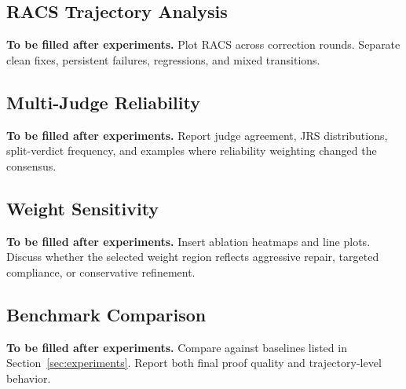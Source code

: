 \documentclass[conference]{IEEEtran}
\begin{document}
\subsection{RACS Trajectory Analysis}
\noindent\textbf{To be filled after experiments.} Plot RACS across correction rounds. Separate clean fixes, persistent failures, regressions, and mixed transitions.

\subsection{Multi-Judge Reliability}
\noindent\textbf{To be filled after experiments.} Report judge agreement, JRS distributions, split-verdict frequency, and examples where reliability weighting changed the consensus.

\subsection{Weight Sensitivity}
\noindent\textbf{To be filled after experiments.} Insert ablation heatmaps and line plots. Discuss whether the selected weight region reflects aggressive repair, targeted compliance, or conservative refinement.

\subsection{Benchmark Comparison}
\noindent\textbf{To be filled after experiments.} Compare against baselines listed in Section~\ref{sec:experiments}. Report both final proof quality and trajectory-level behavior.
\end{document}
